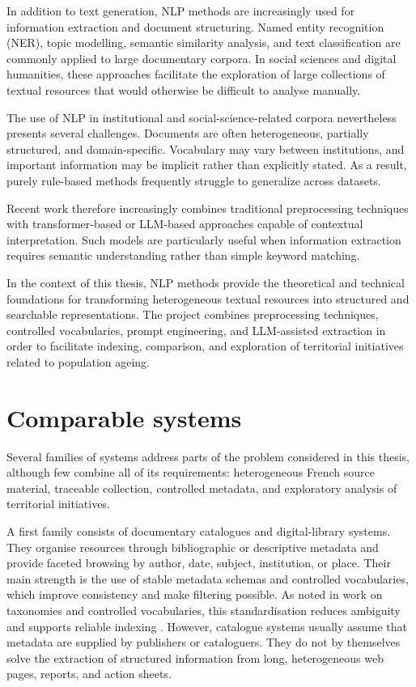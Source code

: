 \documentclass[
11pt,
english,
singlespacing,
headsepline,
]{MastersDoctoralThesis}
\begin{document}
In addition to text generation, NLP methods are increasingly used for information extraction and document structuring. Named entity recognition (NER), topic modelling, semantic similarity analysis, and text classification are commonly applied to large documentary corpora. In social sciences and digital humanities, these approaches facilitate the exploration of large collections of textual resources that would otherwise be difficult to analyse manually.

The use of NLP in institutional and social-science-related corpora nevertheless presents several challenges. Documents are often heterogeneous, partially structured, and domain-specific. Vocabulary may vary between institutions, and important information may be implicit rather than explicitly stated. As a result, purely rule-based methods frequently struggle to generalize across datasets.

Recent work therefore increasingly combines traditional preprocessing techniques with transformer-based or LLM-based approaches capable of contextual interpretation. Such models are particularly useful when information extraction requires semantic understanding rather than simple keyword matching.

In the context of this thesis, NLP methods provide the theoretical and technical foundations for transforming heterogeneous textual resources into structured and searchable representations. The project combines preprocessing techniques, controlled vocabularies, prompt engineering, and LLM-assisted extraction in order to facilitate indexing, comparison, and exploration of territorial initiatives related to population ageing.


\section{Comparable systems}

Several families of systems address parts of the problem considered in this
thesis, although few combine all of its requirements: heterogeneous French
source material, traceable collection, controlled metadata, and exploratory
analysis of territorial initiatives.

A first family consists of documentary catalogues and digital-library systems.
They organise resources through bibliographic or descriptive metadata and
provide faceted browsing by author, date, subject, institution, or place. Their
main strength is the use of stable metadata schemas and controlled vocabularies,
which improve consistency and make filtering possible. As noted in work on
taxonomies and controlled vocabularies, this standardisation reduces ambiguity
and supports reliable indexing \citep{hedden2016taxonomy}. However, catalogue
systems usually assume that metadata are supplied by publishers or cataloguers.
They do not by themselves solve the extraction of structured information from
long, heterogeneous web pages, reports, and action sheets.
\end{document}
